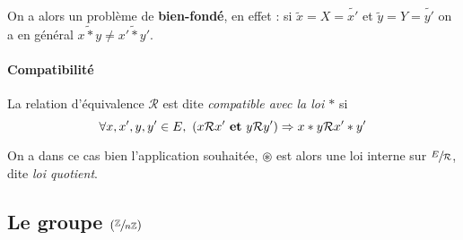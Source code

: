 		On a alors un problème de \textbf{bien-fondé}, en effet : si $\tilde{x} =X=\tilde{x'}$ et $\tilde{y}=Y=\tilde{y'}$ on a en général $\widetilde{x\ast y}\neq \widetilde{x'\ast y'}$.
		
		\traitd
		\paragraph{Compatibilité}
			La relation d'équivalence $\mathcal{R}$ est dite \emph{compatible avec la loi $\ast$} si 
			\[ 
				\forall x,x',y,y' \in E ,~(x\mathcal{R} x' ~\mathbf{et}~y\mathcal{R} y') \Rightarrow x\ast y \mathcal{R} x'\ast y' 
			\vspace{-25pt}
			\] 
		\trait
		
		On a dans ce cas bien l'application souhaitée, $\circledast$ est alors une loi interne sur $\sfrac{E}{\mathcal{R}}$, dite \emph{loi quotient}. \medskip
		
		
	\subsection{Le groupe $(\sfrac{{\mathbb{Z}}}{n{\mathbb{Z}}})$}
		
